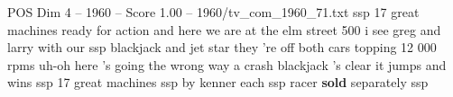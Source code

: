 \begin{textsample}{POS Dim 4 – 1960 – Score 1.00 – 1960/tv\_com\_1960\_71.txt}  \label{ex:f4_pos_018}
ssp 17 great machines ready for action and here we are at the elm street 500 i see greg and larry with our ssp blackjack and jet star they 're off both cars topping 12 000 rpms uh-oh here 's going the wrong way a crash blackjack 's clear it jumps and wins ssp 17 great machines ssp by kenner each ssp racer \textbf{sold} separately ssp

\end{textsample}
